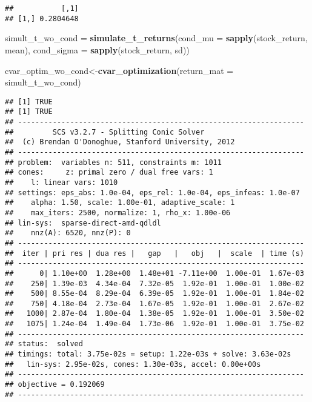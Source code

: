 \documentclass[
]{article}
\newenvironment{Shaded}{\begin{snugshade}}{\end{snugshade}}
\newcommand{\AttributeTok}[1]{\textcolor[rgb]{0.13,0.29,0.53}{#1}}
\newcommand{\DecValTok}[1]{\textcolor[rgb]{0.00,0.00,0.81}{#1}}
\newcommand{\FunctionTok}[1]{\textcolor[rgb]{0.13,0.29,0.53}{\textbf{#1}}}
\newcommand{\NormalTok}[1]{#1}
\newcommand{\OtherTok}[1]{\textcolor[rgb]{0.56,0.35,0.01}{#1}}
\newcommand{\SpecialCharTok}[1]{\textcolor[rgb]{0.81,0.36,0.00}{\textbf{#1}}}
\begin{document}
\begin{Shaded}
\end{Shaded}

\begin{verbatim}
##           [,1]
## [1,] 0.2804648
\end{verbatim}

\begin{Shaded}
\begin{Highlighting}[]
\NormalTok{simult\_t\_wo\_cond }\OtherTok{=} \FunctionTok{simulate\_t\_returns}\NormalTok{(}\AttributeTok{cond\_mu =} \FunctionTok{sapply}\NormalTok{(stock\_return, mean), }\AttributeTok{cond\_sigma =} \FunctionTok{sapply}\NormalTok{(stock\_return, sd))}

\NormalTok{cvar\_optim\_wo\_cond}\OtherTok{\textless{}{-}}\FunctionTok{cvar\_optimization}\NormalTok{(}\AttributeTok{return\_mat =}\NormalTok{ simult\_t\_wo\_cond)}
\end{Highlighting}
\end{Shaded}

\begin{verbatim}
## [1] TRUE
## [1] TRUE
## ------------------------------------------------------------------
##         SCS v3.2.7 - Splitting Conic Solver
##  (c) Brendan O'Donoghue, Stanford University, 2012
## ------------------------------------------------------------------
## problem:  variables n: 511, constraints m: 1011
## cones:     z: primal zero / dual free vars: 1
##    l: linear vars: 1010
## settings: eps_abs: 1.0e-04, eps_rel: 1.0e-04, eps_infeas: 1.0e-07
##    alpha: 1.50, scale: 1.00e-01, adaptive_scale: 1
##    max_iters: 2500, normalize: 1, rho_x: 1.00e-06
## lin-sys:  sparse-direct-amd-qdldl
##    nnz(A): 6520, nnz(P): 0
## ------------------------------------------------------------------
##  iter | pri res | dua res |   gap   |   obj   |  scale  | time (s)
## ------------------------------------------------------------------
##      0| 1.10e+00  1.28e+00  1.48e+01 -7.11e+00  1.00e-01  1.67e-03 
##    250| 1.39e-03  4.34e-04  7.32e-05  1.92e-01  1.00e-01  1.00e-02 
##    500| 8.55e-04  8.29e-04  6.39e-05  1.92e-01  1.00e-01  1.84e-02 
##    750| 4.18e-04  2.73e-04  1.67e-05  1.92e-01  1.00e-01  2.67e-02 
##   1000| 2.87e-04  1.80e-04  1.38e-05  1.92e-01  1.00e-01  3.50e-02 
##   1075| 1.24e-04  1.49e-04  1.73e-06  1.92e-01  1.00e-01  3.75e-02 
## ------------------------------------------------------------------
## status:  solved
## timings: total: 3.75e-02s = setup: 1.22e-03s + solve: 3.63e-02s
##   lin-sys: 2.95e-02s, cones: 1.30e-03s, accel: 0.00e+00s
## ------------------------------------------------------------------
## objective = 0.192069
## ------------------------------------------------------------------
\end{verbatim}
\end{document}
